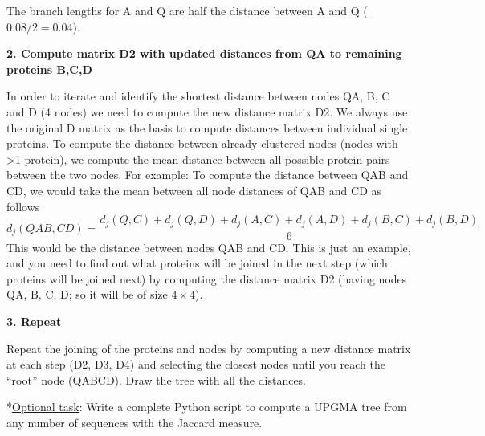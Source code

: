 \documentclass{article}
\begin{document}
\begin{question}[subtitle = Exploring the UPGMA Algorithm]
\begin{center}
    \end{center}
    The branch lengths for A and Q are half the distance between A and Q ($0.08/2 = 0.04$).
    
    \pagebreak
    \textbf{2. Compute matrix D2 with updated distances from QA to remaining proteins B,C,D}
    
    In order to iterate and identify the shortest distance between nodes QA, B, C and D (4 nodes) we need to compute the new distance matrix D2. We always use the original D matrix as the basis to compute distances between individual single proteins. To compute the distance between already clustered nodes (nodes with >1 protein), we compute the mean distance between all possible protein pairs between the two nodes.
    For example: To compute the distance between QAB and CD, we would take the mean between all node distances of QAB and CD as follows
    \begin{equation}
        d_j(QAB, CD) = \frac{d_j(Q, C) + d_j(Q, D) + d_j(A, C) + d_j(A, D) + d_j(B, C) + d_j(B, D)}{6}
    \end{equation}
    This would be the distance between nodes QAB and CD. This is just an example, and you need to find out what proteins will be joined in the next step (which proteins will be joined next) by computing the distance matrix D2 (having nodes QA, B, C, D; so it will be of size $4 \times 4$).

    \textbf{3. Repeat}

    Repeat the joining of the proteins and nodes by computing a new distance matrix at each step (D2, D3, D4) and selecting the closest nodes until you reach the “root” node (QABCD). Draw the tree with all the distances.

    *\underline{Optional task}: Write a complete Python script to compute a UPGMA tree from any number of sequences with the Jaccard measure.
    
\end{question}
\pagebreak
\end{document}
